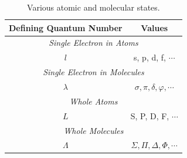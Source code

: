 \documentclass[11pt, twoside, fleqn]{report}
\begin{document}
\begin{table}[H]
    \centering
    \caption{Various atomic and molecular states.}
    \label{t:states}
    \begin{tabular}{cc}
        \toprule
        Defining Quantum Number & Values \\
        \midrule
        \multicolumn{2}{c}{\textit{Single Electron in Atoms}} \\
        \cmidrule(lr){1-2}
        $l$ & s, p, d, f, $\dotsb$ \\
        \multicolumn{2}{c}{\textit{Single Electron in Molecules}} \\
        \cmidrule(lr){1-2}
        $\lambda$ & $\sigma, \pi, \delta, \varphi, \dotsb$ \\
        \multicolumn{2}{c}{\textit{Whole Atoms}} \\
        \cmidrule(lr){1-2}
        $L$ & S, P, D, F, $\dotsb$ \\
        \multicolumn{2}{c}{\textit{Whole Molecules}} \\
        \cmidrule(lr){1-2}
        $\Lambda$ & $\Sigma, \Pi, \Delta, \Phi, \dotsb$ \\
        \bottomrule
    \end{tabular}
\end{table}

\printbibliography
{}
\end{document}
